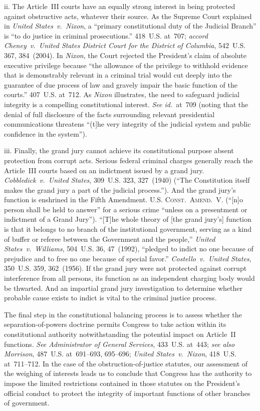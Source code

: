 ii. The Article~III courts have an equally strong interest in being protected against obstructive acts, whatever their source.
As the Supreme Court explained in \textit{United States~v.\ Nixon}, a ``primary constitutional duty of the Judicial Branch'' is ``to do justice in criminal prosecutions.'' 418~U.S. at~707;
\textit{accord Cheney~v.\ United States District Court for the District of Columbia}, 542~U.S. 367, 384~(2004).
In \textit{Nixon}, the Court rejected the President's claim of absolute executive privilege because ``the allowance of the privilege to withhold evidence that is demonstrably relevant in a criminal trial would cut deeply into the guarantee of due process of law and gravely impair the basic function of the courts.'' 407~U.S. at~712.
As \textit{Nixon} illustrates, the need to safeguard judicial integrity is a compelling constitutional interest.
\textit{See id.}~at~709 (noting that the denial of full disclosure of the facts surrounding relevant presidential communications threatens ``(t]he very integrity of the judicial system and public confidence in the system'').

iii. Finally, the grand jury cannot achieve its constitutional purpose absent protection from corrupt acts.
Serious federal criminal charges generally reach the Article~III courts based on an indictment issued by a grand jury.
\textit{Cobbledick~v.\ United States}, 309~U.S. 323, 327~(1940) (``The Constitution itself makes the grand jury a part of the judicial process.'').
And the grand jury's function is enshrined in the Fifth Amendment.
\textsc{U.S. Const.\ Amend.~V}. (``[n]o person shall be held to answer'' for a serious crime ``unless on a presentment or indictment of a Grand Jury'').
``[T]he whole theory of [the grand jury's] function is that it belongs to no branch of the institutional government, serving as a kind of buffer or referee between the Government and the people,'' \textit{United States~v.\ Williams}, 504~U.S. 36, 47~(1992), ``pledged to indict no one because of prejudice and to free no one because of special favor.''
\textit{Costello~v.\ United States}, 350~U.S. 359, 362~(1956).
If the grand jury were not protected against corrupt interference from all persons, its function as an independent charging body would be thwarted.
And an impartial grand jury investigation to determine whether probable cause exists to indict is vital to the criminal justice process.

\hr

The final step in the constitutional balancing process is to assess whether the separation-of-powers doctrine permits Congress to take action within its constitutional authority notwithstanding the potential impact on Article~II functions.
\textit{See Administrator of General Services}, 433~U.S. at~443;
\textit{see also Morrison}, 487~U.S. at~691--693, 695--696;
\textit{United States~v.\ Nixon}, 418~U.S. at~711--712.
In the case of the obstruction-of-justice statutes, our assessment of the weighing of interests leads us to conclude that Congress has the authority to impose the limited restrictions contained in those statutes on the President's official conduct to protect the integrity of important functions of other branches of government.

